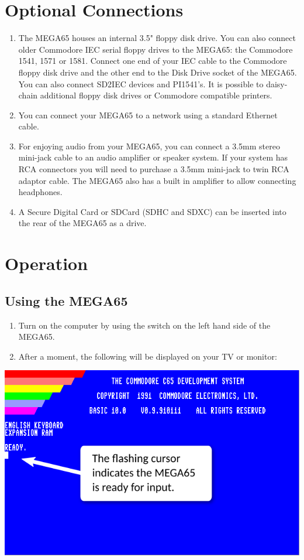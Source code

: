 \section{Optional Connections}

\begin{enumerate}
	\item The MEGA65 houses an internal 3.5" floppy disk drive. You can also connect older Commodore{\textregistered} IEC serial floppy drives to the MEGA65: the Commodore{\textregistered} 1541, 1571 or 1581. Connect one end of your IEC cable to the Commodore{\textregistered} floppy disk drive and the other end to the Disk Drive socket of the MEGA65. You can also connect SD2IEC devices and PI1541's. It is possible to daisy-chain additional floppy disk drives or Commodore{\textregistered} compatible printers.
	\item You can connect your MEGA65 to a network using a standard Ethernet cable.
	\item For enjoying audio from your MEGA65, you can connect a 3.5mm stereo mini-jack cable to an audio amplifier or speaker system. If your system has RCA connectors you will need to purchase a 3.5mm mini-jack to twin RCA adaptor cable. The MEGA65 also has a built in amplifier to allow connecting headphones.
	\item A Secure Digital Card or SDCard (SDHC and SDXC) can be inserted into the rear of the MEGA65 as a drive.
\end{enumerate}


\section{Operation}

\subsection{Using the MEGA65}

\begin{enumerate}
	\item Turn on the computer by using the switch on the left hand side of the MEGA65.
	\item After a moment, the following will be displayed on your TV or monitor:
\end{enumerate}

\includegraphics[width=\linewidth]{images/introduction-screen/switched-on.png}

